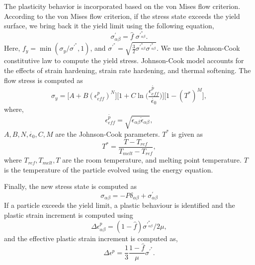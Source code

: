 The plasticity behavior is incorporated based on the von Mises flow criterion.
According to the von Mises flow criterion, if the stress state exceeds the yield
surface, we bring back it the yield limit using the following equation,
\begin{equation}
  \sigma^{'}_{\alpha \beta} = \hat{f} \; \sigma^{'}^{*}_{\alpha \beta}.
\end{equation}
Here, $f_y = \min{(\sigma_y / \sigma^{'}^*, 1)}$, and
$\sigma^{'}^* = \sqrt{\frac{3}{2} \sigma^{'}^*_{\alpha \beta}
  \sigma^{'}^*_{\alpha \beta}}$. We use the Johnson-Cook constitutive
law \citep{johnson1983constitutive} to compute the yield
stress. Johnson-Cook model accounts for the effects of strain hardening, strain
rate hardening, and thermal softening. The flow stress is computed as
\begin{equation}
  \sigma_y = \bigg[A + B (\epsilon^{p}_{eff})^N \bigg]
  \bigg[1 + C \ln\bigg(\frac{\dot{\epsilon^{p}_{eff}}}{\dot{\epsilon_0}}\bigg) \bigg] \bigg[1 - (T^*)^M \bigg],
\end{equation}
where,
\begin{equation}
  \dot{\epsilon^{p}_{eff}} = \sqrt{\dot{\epsilon}_{\alpha \beta} \dot{\epsilon}_{\alpha \beta}},
\end{equation}
$A, B, N, \dot{\epsilon_{0}}, C, M$ are the Johnson-Cook parameters. $T^*$ is given as
\begin{equation}
  T^* = \frac{T - T_{ref}}{T_{melt} - T_{ref}},
\end{equation}
where $T_{ref}, T_{melt}, T$ are the room temperature, and melting point
temperature. $T$ is the temperature of the particle evolved using the energy
equation.

Finally, the new stress state is computed as
\begin{equation}
  \sigma_{\alpha \beta} = - P\delta_{\alpha \beta} + \sigma^{'}_{\alpha \beta}
\end{equation}
If a particle exceeds the yield limit, a plastic behaviour is identified and the
plastic strain increment is computed using
\begin{equation}
  \Delta \epsilon^{p}_{\alpha \beta} = (1 - \hat{f}) \sigma^{'}^{*}_{\alpha \beta} / 2 \mu,
\end{equation}
and the effective plastic strain increment is computed as,
\begin{equation}
  \Delta \epsilon^{p} = \frac{1}{3} \frac{1 - \hat{f}}{\mu}\sigma^{'}^{*}.
\end{equation}


